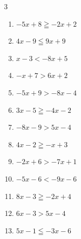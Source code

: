 \begin{multicols}{3}
\begin{enumerate}

  \item $-5x+8\geqq -2x+2$

        \phantom{$\displaystyle x\leqq 2$}

  \item $4x-9\leqq 9x+9$


  \item $x-3<-8x+5$


\columnbreak %

\resetques

  \item $-x+7>6x+2$


  \item $-5x+9>-8x-4$


  \item $3x-5\geqq -4x-2$


  \item $-8x-9>5x-4$


  \item $4x-2\geqq -x+3$

        \phantom{$\displaystyle x\geqq 1$}

  \item $-2x+6>-7x+1$

        \phantom{$\displaystyle x>-1$}

  \item $-5x-6<-9x-6$

        \phantom{$\displaystyle x<0$}

  \item $8x-3\geqq -2x+4$


  \item $6x-3>5x-4$

        \phantom{$\displaystyle x>-1$}

  \item $5x-1\leqq -3x-6$


\end{enumerate}
\end{multicols}
